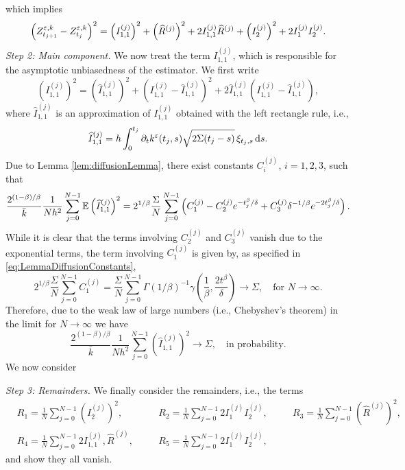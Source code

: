 \documentclass[10pt]{article}
\begin{document}
which implies
\begin{equation}
	\left(Z^{\varepsilon,k}_{t_{j+1}} - Z^{\varepsilon,k}_{t_j}\right)^2 = \left(I_{1,1}^{(j)}\right)^2 + \left(\widehat R^{(j)}\right)^2 + 2 I_{1,1}^{(j)} \widehat R^{(j)} + \left(I_2^{(j)}\right)^2 + 2I_1^{(j)}I_2^{(j)}.
\end{equation}
\textit{Step 2: Main component.} We now treat the term $I_{1,1}^{(j)}$, which is responsible for the asymptotic unbiasedness of the estimator. We first write
\begin{equation}
	\left(I_{1,1}^{(j)}\right)^2 = \left(\widehat I_{1,1}^{(j)} \right)^2 + \left(I_{1,1}^{(j)} - \widehat I_{1,1}^{(j)}\right)^2  + 2 \widehat I_{1,1}^{(j)} \left(I_{1,1}^{(j)} - \widehat I_{1,1}^{(j)}\right),
\end{equation}
where $\widehat I_{1,1}^{(j)}$ is an approximation of $I_{1,1}^{(j)}$ obtained with the left rectangle rule, i.e.,
\begin{equation}
	\widehat I_{1,1}^{(j)} = h \int_0^{t_j} \partial_t k^\varepsilon(t_j, s)\sqrt{2\Sigma(t_j-s)} \, \xi_{t_j,s} \,\mathrm{d} s.
\end{equation}
Due to Lemma \ref{lem:diffusionLemma}, there exist constants $C_i^{(j)}$, $i=1,2,3$, such that
\begin{equation}
	\frac{2^{(1-\beta)/\beta}}{\bar k} \frac1{Nh^2} \sum_{j=0}^{N-1} \operatorname{\mathbb{E}} \left(\widehat I_{1,1}^{(j)} \right)^2 = 2^{1/\beta} \frac{\Sigma}{N} \sum_{j=0}^{N-1} \left( C_1^{(j)} - C_2^{(j)}e^{-t_j^\beta/\delta} + C_3^{(j)}\delta^{-1/\beta} e^{-2t_j^\beta / \delta} \right).
\end{equation}
While it is clear that the terms involving $C_2^{(j)}$ and $C_3^{(j)}$ vanish due to the exponential terms, the term involving $C_1^{(j)}$ is given by, as specified in \eqref{eq:LemmaDiffusionConstants},
\begin{equation}
	2^{1/\beta} \frac{\Sigma}{N} \sum_{j=0}^{N-1} C_1^{(j)} = \frac{\Sigma}{N} \sum_{j=0}^{N-1} \Gamma(1/\beta)^{-1} \gamma\left(\frac1\beta, \frac{2t^\beta}{\delta}\right) \to \Sigma, \quad \text{for } N \to \infty.
\end{equation}
Therefore, due to the weak law of large numbers (i.e., Chebyshev's theorem) in the limit for $N \to \infty$ we have
\begin{equation}
	\frac{2^{(1-\beta)/\beta}}{\bar k} \frac1{Nh^2} \sum_{j=0}^{N-1} \left(\widehat I_{1,1}^{(j)} \right)^2 \to \Sigma, \quad \text{in probability.}
\end{equation}
We now consider 


\textit{Step 3: Remainders.} We finally consider the remainders, i.e., the terms
\begin{equation}
\begin{alignedat}{3}
	&R_1 = \frac1N \sum_{j=0}^{N-1} \left(I_2^{(j)}\right)^2, \quad &&R_2 = \frac1N \sum_{j=0}^{N-1} 2I_1^{(j)}I_2^{(j)}, \quad &&R_3 = \frac1N \sum_{j=0}^{N-1} \left(\widehat R^{(j)}\right)^2, \\
	&R_4 = \frac1N \sum_{j=0}^{N-1}2 I_{1,1}^{(j)}, \widehat R^{(j)}, \quad &&R_5 = \frac1N \sum_{j=0}^{N-1}2I_1^{(j)}I_2^{(j)}, 
\end{alignedat}
\end{equation}
and show they all vanish.
\end{document}
